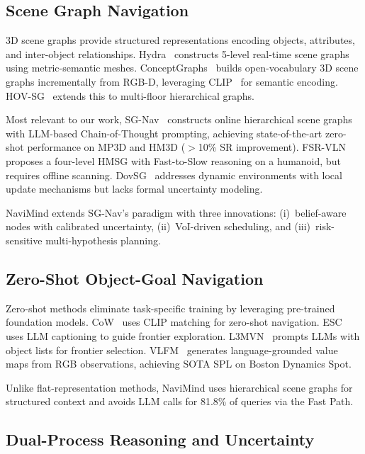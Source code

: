 \documentclass[conference]{IEEEtran}
\begin{document}
\subsection{Scene Graph Navigation}

3D scene graphs provide structured representations encoding objects, attributes, and inter-object relationships.
Hydra~\cite{hydra2022} constructs 5-level real-time scene graphs using metric-semantic meshes.
ConceptGraphs~\cite{conceptgraphs2024} builds open-vocabulary 3D scene graphs incrementally from RGB-D, leveraging CLIP~\cite{clip2021} for semantic encoding.
HOV-SG~\cite{hovsg2024} extends this to multi-floor hierarchical graphs.

Most relevant to our work, SG-Nav~\cite{sgnav2024} constructs online hierarchical scene graphs with LLM-based Chain-of-Thought prompting, achieving state-of-the-art zero-shot performance on MP3D and HM3D ($>$10\% SR improvement).
FSR-VLN~\cite{fsrvln2025} proposes a four-level HMSG with Fast-to-Slow reasoning on a humanoid, but requires offline scanning.
DovSG~\cite{dovsg2024} addresses dynamic environments with local update mechanisms but lacks formal uncertainty modeling.

NaviMind extends SG-Nav's paradigm with three innovations: (i)~belief-aware nodes with calibrated uncertainty, (ii)~VoI-driven scheduling, and (iii)~risk-sensitive multi-hypothesis planning.

\subsection{Zero-Shot Object-Goal Navigation}

Zero-shot methods eliminate task-specific training by leveraging pre-trained foundation models.
CoW~\cite{cow2023} uses CLIP matching for zero-shot navigation.
ESC~\cite{esc2023} uses LLM captioning to guide frontier exploration.
L3MVN~\cite{l3mvn2023} prompts LLMs with object lists for frontier selection.
VLFM~\cite{vlfm2024} generates language-grounded value maps from RGB observations, achieving SOTA SPL on Boston Dynamics Spot.

Unlike flat-representation methods, NaviMind uses hierarchical scene graphs for structured context and avoids LLM calls for 81.8\% of queries via the Fast Path.

\subsection{Dual-Process Reasoning and Uncertainty}
\end{document}
